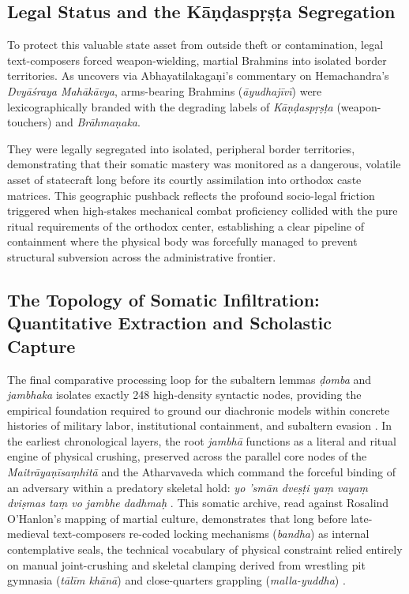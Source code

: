 \documentclass[11pt,twoside,letterpaper]{article}
\begin{document}
\subsection{Legal Status and the Kāṇḍaspṛṣṭa Segregation}
To protect this valuable state asset from outside theft or contamination, legal text-composers forced weapon-wielding, martial Brahmins into isolated border territories. As \citet{Sandesara1948} uncovers via Abhayatilakagaṇi’s commentary on Hemachandra’s \textit{Dvyāśraya Mahākāvya}, arms-bearing Brahmins (\textit{āyudhajīvī}) were lexicographically branded with the degrading labels of \textit{Kāṇḍaspṛṣṭa} (weapon-touchers) and \textit{Brāhmaṇaka}. 

They were legally segregated into isolated, peripheral border territories, demonstrating that their somatic mastery was monitored as a dangerous, volatile asset of statecraft long before its courtly assimilation into orthodox caste matrices. This geographic pushback reflects the profound socio-legal friction triggered when high-stakes mechanical combat proficiency collided with the pure ritual requirements of the orthodox center, establishing a clear pipeline of containment where the physical body was forcefully managed to prevent structural subversion across the administrative frontier.

\subsection{The Topology of Somatic Infiltration: Quantitative Extraction and Scholastic Capture}
The final comparative processing loop for the subaltern lemmas \textit{ḍomba} and \textit{jambhaka} isolates exactly 248 high-density syntactic nodes, providing the empirical foundation required to ground our diachronic models within concrete histories of military labor, institutional containment, and subaltern evasion \citep{Lorenzen1978, mccartneyforthcomingA}. In the earliest chronological layers, the root \textit{jambhā} functions as a literal and ritual engine of physical crushing, preserved across the parallel core nodes of the \textit{Maitrāyaṇīsaṃhitā} and the Atharvaveda which command the forceful binding of an adversary within a predatory skeletal hold: \textit{yo ’smān dveṣṭi yaṃ vayaṃ dviṣmas taṃ vo jambhe dadhmaḥ} \citep{mccartneyforthcomingB}. This somatic archive, read against Rosalind O’Hanlon’s mapping of martial culture, demonstrates that long before late-medieval text-composers re-coded locking mechanisms (\textit{bandha}) as internal contemplative seals, the technical vocabulary of physical constraint relied entirely on manual joint-crushing and skeletal clamping derived from wrestling pit gymnasia (\textit{tālīm khānā}) and close-quarters grappling (\textit{malla-yuddha}) \citep{Birch2024, OHanlon2007}.
\end{document}
